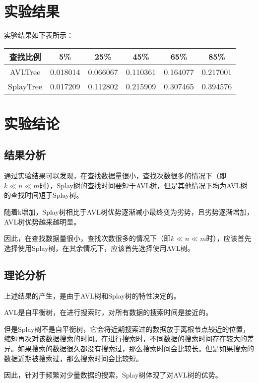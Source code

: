 \documentclass[UTF8]{ctexart}
\begin{document}
\clearpage

\section{实验结果}

实验结果如下表所示：

\begin{center}
    \begin{tabular}{|c|c|c|c|c|c|}
        \hline
        查找比例&	5\%&	25\%&	45\%&	65\%&	85\%\\
        \hline
        AVLTree&	0.018014&	0.066067&	0.110361&	0.164077&	0.217001\\
        \hline
        SplayTree&	0.017209&	0.112802&	0.215909&	0.307465&	0.394576\\
        \hline
    \end{tabular}
\end{center}

\section{实验结论}

\subsection{结果分析}

通过实验结果可以发现，在查找数据量很小，查找次数很多的情况下（即$k \ll n \ll m$时），Splay树的查找时间要短于AVL树，但是其他情况下均为AVL树的查找时间短于Splay树。

随着k增加，Splay树相比于AVL树优势逐渐减小最终变为劣势，且劣势逐渐增加，AVL树优势越来越明显。

因此，在查找数据量很小，查找次数很多的情况下（即$k \ll n \ll m$时），应该首先选择使用Splay树，在其余情况下，应该首先选择使用AVL树。

\subsection{理论分析}

上述结果的产生，是由于AVL树和Splay树的特性决定的。

AVL是自平衡树，在进行搜索时，对所有数据的搜索时间是接近的。

但是Splay树不是自平衡树，它会将近期搜索过的数据放于离根节点较近的位置，缩短再次对该数据搜索的时间。在进行搜索时，不同数据的搜索时间存在较大的差异。如果搜索的数据很久都没有搜索过，那么搜索时间会比较长。但是如果搜索的数据近期被搜索过，那么搜索时间会比较短。

因此，针对于频繁对少量数据的搜索，Splay树体现了对AVL树的优势。
\end{document}
